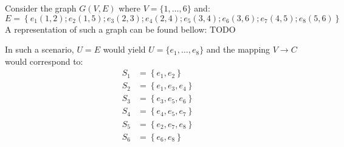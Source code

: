 \documentclass[runningheads]{llncs}
\begin{document}
\begin{example}
	Consider the graph $G(V,E)$ where $V=\{1,\hdots,6\}$ and: $$E=\left\{e_1(1,2);e_2(1,5);e_3(2,3);e_4(2,4);e_5(3,4);e_6(3,6); e_7(4,5); e_8(5,6)\right\}$$
	A representation of such a graph can be found bellow: TODO
	
	In such a scenario, $U=E$ would yield $U=\{e_1,\hdots,e_8\}$ and the mapping $V\to C$ would correspond to:
	\begin{align*}
		S_1&=\left\{e_1,e_2\right\}\\
		S_2&=\left\{e_1,e_3,e_4\right\}\\
		S_3&=\left\{e_3,e_5,e_6\right\}\\
		S_4&=\left\{e_4,e_5,e_7\right\}\\
		S_5&=\left\{e_2,e_7,e_8\right\}\\
		S_6&=\left\{e_6,e_8\right\}
	\end{align*}
\end{example}
\end{document}
